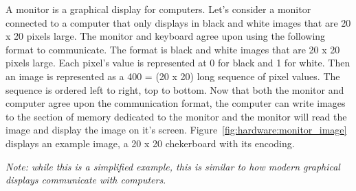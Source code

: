 \begin{example}
A monitor is a graphical display for computers. Let's consider a monitor
connected to a computer that only displays in black and white images
that are 20 x 20 pixels large. The monitor and keyboard agree upon using
the following format to communicate. The format is black and white images
that are 20 x 20 pixels large. Each pixel's value is represented at 0 for
black and 1 for white. Then an image is represented as a 400 = (20 x 20) long
sequence of pixel values. The sequence is ordered left to right, top to bottom.
Now that both the monitor and computer agree upon the communication format, the
computer can write images to the section of memory dedicated to the monitor
and the monitor will read the image and display the image on it's screen.
Figure~\ref{fig:hardware:monitor_image} displays an example image, a 
20 x 20 chekerboard with its encoding.

\emph{Note: while this is a simplified example, this is similar to how modern
graphical displays communicate with computers}.
\end{example}

